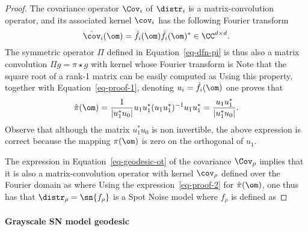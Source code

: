 \begin{proof}
	The covariance operator $\Cov_i$ of $\distr_i$ is a matrix-convolution operator, and its associated kernel $\cov_i$ has the following Fourier transform 
	\begin{equation}
        \label{eq-proof-1}
		\hat \cov_i(\om) = \hat f_i(\om) \hat f_i(\om)^*  \in \CC^{d \times d}.
	\end{equation}	
	The symmetric operator $\Pi$ defined in Equation~\eqref{eq-dfn-pi} is thus also a matrix convolution $\Pi g = \pi \star g$ with kernel whose Fourier transform is 
	Note that the square root of a rank-1 matrix can be easily computed as
	Using this property, together with Equation~\eqref{eq-proof-1},
	denoting $u_i = \hat f_i(\om)$ one proves that
	\begin{equation}
        \label{eq-proof-2}
		\hat \pi(\om)
        = \frac{1}{|u_1^*u_0|} u_1 u_1^* ( u_1 u_1^* )^{-1} u_1 u_1^*
		= \frac{u_1 u_1^*}{|u_1^*u_0|}.
	\end{equation}
	Observe that although the matrix  $u_1^* u_0$ %
	is non invertible, the above expression is correct because
	the mapping $\pi(\om) $ is zero on the orthogonal of $u_1$.

	The expression in Equation~\eqref{eq-geodesic-ot} of the covariance $\Cov_\rho$ implies that it is also a matrix-convolution operator with kernel $\cov_\rho$ defined over the Fourier domain as
    where
	Using the expression~\eqref{eq-proof-2} for $\hat \pi(\om)$, one thus has that $\distr_\rho = \sn{f_\rho}$ is a Spot Noise model where $f_\rho$ is defined as
\end{proof}


\paragraph{Grayscale SN model geodesic}


